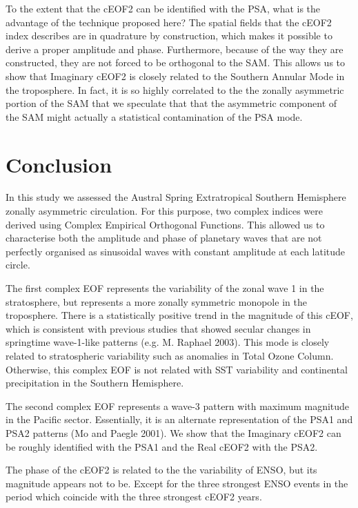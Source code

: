 \documentclass[smallextended]{svjour3}       %
\begin{document}
To the extent that the cEOF2 can be identified with the PSA, what is the advantage of the technique proposed here?
The spatial fields that the cEOF2 index describes are in quadrature by construction, which makes it possible to derive a proper amplitude and phase.
Furthermore, because of the way they are constructed, they are not forced to be orthogonal to the SAM.
This allows us to show that Imaginary cEOF2 is closely related to the Southern Annular Mode in the troposphere.
In fact, it is so highly correlated to the the zonally asymmetric portion of the SAM that we speculate that that the asymmetric component of the SAM might actually a statistical contamination of the PSA mode.

\hypertarget{conclusion}{%
\section{Conclusion}\label{conclusion}}

In this study we assessed the Austral Spring Extratropical Southern Hemisphere zonally asymmetric circulation.
For this purpose, two complex indices were derived using Complex Empirical Orthogonal Functions.
This allowed us to characterise both the amplitude and phase of planetary waves that are not perfectly organised as sinusoidal waves with constant amplitude at each latitude circle.

The first complex EOF represents the variability of the zonal wave 1 in the stratosphere, but represents a more zonally symmetric monopole in the troposphere.
There is a statistically positive trend in the magnitude of this cEOF, which is consistent with previous studies that showed secular changes in springtime wave-1-like patterns (e.g. M. Raphael 2003).
This mode is closely related to stratospheric variability such as anomalies in Total Ozone Column.
Otherwise, this complex EOF is not related with SST variability and continental precipitation in the Southern Hemisphere.

The second complex EOF represents a wave-3 pattern with maximum magnitude in the Pacific sector.
Essentially, it is an alternate representation of the PSA1 and PSA2 patterns (Mo and Paegle 2001).
We show that the Imaginary cEOF2 can be roughly identified with the PSA1 and the Real cEOF2 with the PSA2.

The phase of the cEOF2 is related to the the variability of ENSO, but its magnitude appears not to be. Except for the three strongest ENSO events in the period which coincide with the three strongest cEOF2 years.
\end{document}

